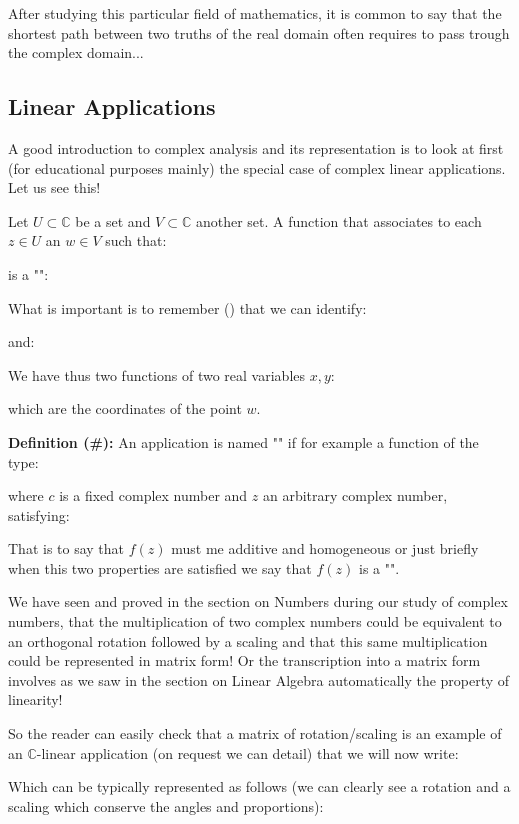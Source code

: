 	After studying this particular field of mathematics, it is common to say that the shortest path between two truths of the real domain often requires to pass trough the complex domain...

	\subsection{Linear Applications}

	A good introduction to complex analysis and its representation is to look at first (for educational purposes mainly) the special case of complex linear applications. Let us see this!

Let $U \subset \mathbb{C}$ be a set and $V \subset \mathbb{C}$ another set. A function that associates to each $z \in U$ an $w \in V$ such that:
	
is a "":
	
What is important is to remember () that we can identify:
	
and:
	
We have thus two functions of two real variables $x, y$:
	
which are the coordinates of the point $w$.

\textbf{Definition (\#\mydef):} An application is named "" if for example a function of the type:
	
where $c$ is a fixed complex number and $z$ an arbitrary complex number, satisfying:
	

That is to say that $f(z)$ must me additive and homogeneous or just briefly when this two properties are satisfied we say that $f(z)$ is a "".

We have seen and proved in the section on Numbers during our study of complex numbers, that the multiplication of two complex numbers could be equivalent to an orthogonal rotation followed by a scaling and that this same multiplication could be represented in matrix form! Or the transcription into a matrix form involves as we saw in the section on Linear Algebra automatically  the property of linearity!

So the reader can easily check that a matrix of rotation/scaling is an example of an $\mathbb{C}$-linear application (on request we can detail) that we will now write:
	
Which can be typically represented as follows (we can clearly see a rotation and a scaling which conserve the angles and proportions):

